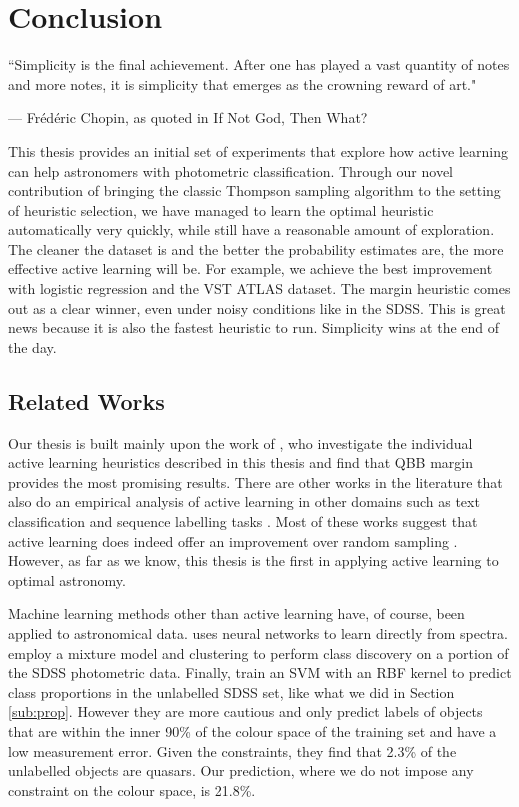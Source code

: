 
\chapter{Conclusion}
\label{cha:conclusion}


\epigraph{``Simplicity is the final achievement. After one has played a vast quantity of notes and more notes, it is simplicity that emerges as the crowning reward of art."}{--- \textup{Fr\'ed\'eric Chopin, as quoted in} If Not God, Then What?}


This thesis provides an initial set of experiments that explore how active learning can help
astronomers with photometric classification. Through our novel contribution of bringing the classic
Thompson sampling algorithm to the setting of heuristic selection, we have managed to learn the
optimal heuristic automatically very quickly, while still have a reasonable amount of exploration.
The cleaner the dataset is and the better the probability estimates are, the more effective active
learning will be. For example, we achieve the best improvement with logistic regression and the VST
ATLAS dataset. The margin heuristic comes out as a clear winner, even under noisy conditions like
in the SDSS. This is great news because it is also the fastest heuristic to run. Simplicity
wins at the end of the day.


\section{Related Works}
\label{sec:related}

Our thesis is built mainly upon the work of , who investigate the individual active
learning heuristics described in this thesis and find that QBB margin provides the most promising
results. There are other works in the literature that also do an empirical analysis of active
learning in other domains such as text classification \cite{tong02} and sequence labelling tasks
\cite{settles08}. Most of these works suggest that active learning does indeed offer an improvement
over random sampling . However, as far as we know, this thesis is the first in applying
active learning to optimal astronomy.

Machine learning methods other than active learning have, of course, been applied to astronomical
data.  uses neural networks to learn directly from spectra. 
employ a mixture model and clustering to perform class discovery on a portion of the SDSS
photometric data. Finally,  train an SVM with an RBF kernel to predict class
proportions in the unlabelled SDSS set, like what we did in Section \ref{sub:prop}. However they
are more cautious and only predict labels of objects that are within the inner 90\% of the
colour space of the training set and have a low measurement error. Given the constraints, they
find that 2.3\% of the unlabelled objects are quasars. Our prediction, where we do not
impose any constraint on the colour space, is 21.8\%.


